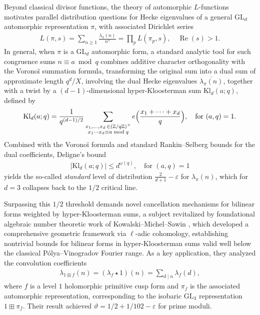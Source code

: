 \documentclass[11pt,reqno]{amsart}
\newcommand{\bea}{\begin{eqnarray}}
\newcommand{\eea}{\end{eqnarray}}
\newcommand{\bna}{\begin{eqnarray*}}
\newcommand{\ena}{\end{eqnarray*}}
\numberwithin{equation}{section}
\theoremstyle{plain}
\theoremstyle{definition}
\renewcommand{\Re}{\operatorname{Re}}
\newcommand{\Kl}{\mathrm{Kl}}
\begin{document}
Beyond classical divisor functions, the theory of automorphic $L$-functions motivates parallel 
distribution questions for Hecke eigenvalues of a general $\textrm{GL}_d$ automorphic representation $\pi$,
with associated Dirichlet series
\bna
L(\pi, s)=\sum_{n\geq 1}\frac{\lambda_{\pi}(n)}{n^s}=\prod_pL(\pi_p,s), \quad\Re(s)>1.
\ena
In general, when $\pi$ is a $\textrm{GL}_d$ automorphic form,
a standard analytic tool for such congruence sums $n\equiv a \bmod q$ combines additive character orthogonality 
with the Vorono\"{i} summation formula,
transforming the original sum into a dual sum of approximate length $q^d/X$, involving the dual Hecke eigenvalues
$\overline{\lambda_{\pi}(n)}$, together with a twist by a $(d-1)$-dimensional
hyper-Kloosterman sum $\text{Kl}_d(a;q)$, defined by
$$
\Kl_d(a;q)=\frac{1}{q^{(d-1)/2}}
\sum_{\substack{x_1,\ldots,
x_d\,\in(\mathbb Z/q\mathbb Z)^\times\\x_1\cdots
x_d\equiv a\bmod q}}e\Bigl(\frac{x_1+\cdots+x_d}{q}\Bigr), \quad\text{for}\,\,(a,q)=1.
$$
Combined with the Vorono\"i formula and standard Rankin--Selberg
bounds for the dual coefficients, Deligne’s bound 
\bea\label{a5}
|\Kl_d(a;q)|\leq d^{\omega(q)},\quad\text{for}\,\,(a,q)=1
\eea
yields the so-called \emph{standard} level of distribution
$\frac{2}{d+1}-\varepsilon$ for $\lambda_{\pi}(n)$, which for $d=3$ collapses back to the $1/2$ critical line. 

Surpassing this $1/2$ threshold demands novel cancellation mechanisms 
for bilinear forms weighted by hyper-Kloosterman sums, 
a subject revitalized by foundational algebraic number theoretic work of Kowalski--Michel--Sawin \cite{KMS},
which developed a comprehensive geometric framework via 
$\ell$-adic cohomology, establishing nontrivial bounds for bilinear forms 
in hyper-Kloosterman sums valid well below the classical P\'{o}lya--Vinogradov Fourier range. 
As a key application, they analyzed the convolution coefficients
\bea\label{a1}
\lambda_{1\boxplus f}(n)=(\lambda_f \star 1)(n)=\sum_{d\mid n}\lambda_{f}(d),
\eea
where \(f\) is a level \(1\) holomorphic primitive cusp form
and \(\pi_f\) is the associated automorphic representation,
corresponding to the isobaric $\textrm{GL}_3$ representation $1\boxplus \pi_f$.
Their result achieved $\vartheta=1/2+1/102-\varepsilon$
for prime moduli.
\end{document}
